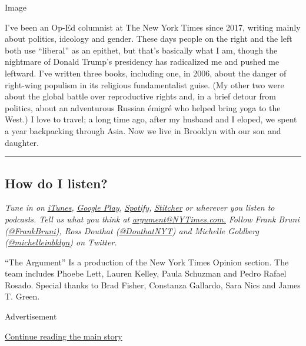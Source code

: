 Image

I've been an Op-Ed columnist at The New York Times since 2017, writing
mainly about politics, ideology and gender. These days people on the
right and the left both use ``liberal'' as an epithet, but that's
basically what I am, though the nightmare of Donald Trump's presidency
has radicalized me and pushed me leftward. I've written three books,
including one, in 2006, about the danger of right-wing populism in its
religious fundamentalist guise. (My other two were about the global
battle over reproductive rights and, in a brief detour from politics,
about an adventurous Russian émigré who helped bring yoga to the West.)
I love to travel; a long time ago, after my husband and I eloped, we
spent a year backpacking through Asia. Now we live in Brooklyn with our
son and daughter.

\begin{center}\rule{0.5\linewidth}{\linethickness}\end{center}

\hypertarget{how-do-i-listen}{%
\subsection{How do I listen?}\label{how-do-i-listen}}

\emph{Tune in on}
\href{https://itunes.apple.com/us/podcast/the-argument/id1438024613?mt=2}{\emph{iTunes}}\emph{,}
\href{https://play.google.com/music/listen?u=0\#/ps/Idxib4hsg3yviao4gtym76knjjy}{\emph{Google
Play}}\emph{,}
\href{https://open.spotify.com/episode/5fIsHqqunLBwoxPSUUSGre?si=Rz5D9VnlRFKdGMu8ixzBOw}{\emph{Spotify}}\emph{,}
\href{https://www.stitcher.com/podcast/the-new-york-times/the-argument}{\emph{Stitcher}}
\emph{or wherever you listen to podcasts. Tell us what you think at}
\href{mailto:argument@NYTimes.com}{\emph{argument@NYTimes.com.}}
\emph{Follow Frank Bruni
(}\href{https://twitter.com/FrankBruni}{\emph{@FrankBruni}}\emph{), Ross
Douthat
(}\href{https://twitter.com/DouthatNYT}{\emph{@DouthatNYT}}\emph{) and
Michelle Goldberg
(}\href{https://twitter.com/michelleinbklyn}{\emph{@michelleinbklyn}}\emph{)
on Twitter.}

``The Argument'' Is a production of the New York Times Opinion section.
The team includes Phoebe Lett, Lauren Kelley, Paula Schuzman and Pedro
Rafael Rosado. Special thanks to Brad Fisher, Constanza Gallardo, Sara
Nics and James T. Green.

Advertisement

\protect\hyperlink{after-bottom}{Continue reading the main story}

